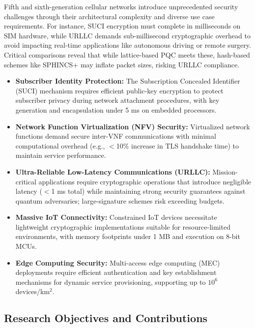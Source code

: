 \documentclass[11pt,a4paper]{article}
\begin{document}
Fifth and sixth-generation cellular networks introduce unprecedented security challenges through their architectural complexity and diverse use case requirements. For instance, SUCI encryption must complete in milliseconds on SIM hardware, while URLLC demands sub-millisecond cryptographic overhead to avoid impacting real-time applications like autonomous driving or remote surgery. Critical comparisons reveal that while lattice-based PQC meets these, hash-based schemes like SPHINCS+ may inflate packet sizes, risking URLLC compliance.

\begin{itemize}
    \item \textbf{Subscriber Identity Protection:} The Subscription Concealed Identifier (SUCI) mechanism requires efficient public-key encryption to protect subscriber privacy during network attachment procedures, with key generation and encapsulation under 5 ms on embedded processors.
    
    \item \textbf{Network Function Virtualization (NFV) Security:} Virtualized network functions demand secure inter-VNF communications with minimal computational overhead (e.g., $<$10\% increase in TLS handshake time) to maintain service performance.
    
    \item \textbf{Ultra-Reliable Low-Latency Communications (URLLC):} Mission-critical applications require cryptographic operations that introduce negligible latency ($<$1 ms total) while maintaining strong security guarantees against quantum adversaries; large-signature schemes risk exceeding budgets.
    
    \item \textbf{Massive IoT Connectivity:} Constrained IoT devices necessitate lightweight cryptographic implementations suitable for resource-limited environments, with memory footprints under 1 MB and execution on 8-bit MCUs.
    
    \item \textbf{Edge Computing Security:} Multi-access edge computing (MEC) deployments require efficient authentication and key establishment mechanisms for dynamic service provisioning, supporting up to $10^6$ devices/km$^2$.
\end{itemize}

\subsection{Research Objectives and Contributions}
\end{document}
